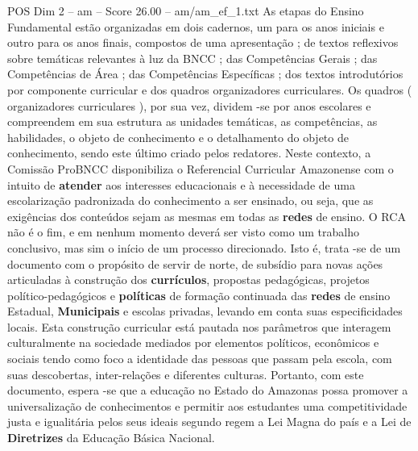 \begin{textsample}{POS Dim 2 – am – Score 26.00 – am/am\_ef\_1.txt}
As etapas do Ensino Fundamental estão organizadas em dois cadernos, um para os anos iniciais e outro para os anos finais, compostos de uma apresentação ; de textos reflexivos sobre temáticas relevantes à luz da BNCC ; das Competências Gerais ; das Competências de Área ; das Competências Específicas ; dos textos introdutórios por componente curricular e dos quadros organizadores curriculares.
Os quadros ( organizadores curriculares ), por sua vez, dividem -se por anos escolares e compreendem em sua estrutura as unidades temáticas, as competências, as habilidades, o objeto de conhecimento e o detalhamento do objeto de conhecimento, sendo este último criado pelos redatores.
Neste contexto, a Comissão ProBNCC disponibiliza o Referencial Curricular Amazonense com o intuito de \textbf{atender} aos interesses educacionais e à necessidade de uma escolarização padronizada do conhecimento a ser ensinado, ou seja, que as exigências dos conteúdos sejam as mesmas em todas as \textbf{redes} de ensino.
O RCA não é o fim, e em nenhum momento deverá ser visto como um trabalho conclusivo, mas sim o início de um processo direcionado.
Isto é, trata -se de um documento com o propósito de servir de norte, de subsídio para novas ações articuladas à construção dos \textbf{currículos}, propostas pedagógicas, projetos político-pedagógicos e \textbf{políticas} de formação continuada das \textbf{redes} de ensino Estadual, \textbf{Municipais} e escolas privadas, levando em conta suas especificidades locais.
Esta construção curricular está pautada nos parâmetros que interagem culturalmente na sociedade mediados por elementos políticos, econômicos e sociais tendo como foco a identidade das pessoas que passam pela escola, com suas descobertas, inter-relações e diferentes culturas.
Portanto, com este documento, espera -se que a educação no Estado do Amazonas possa promover a universalização de conhecimentos e permitir aos estudantes uma competitividade justa e igualitária pelos seus ideais segundo regem a Lei Magna do país e a Lei de \textbf{Diretrizes} da Educação Básica Nacional.

\end{textsample}
